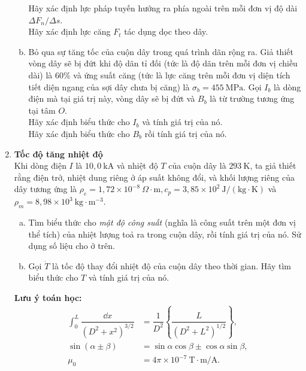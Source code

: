 \begin{vd}
\begin{enumerate}[1)]
\begin{enumerate}[a)]
Hãy xác định lực pháp tuyến hướng ra phía ngoài trên mỗi đơn vị độ dài $\Delta F_{{n}} / \Delta s$.\\
Hãy xác định lực căng $F_{t}$ tác dụng dọc theo dây.
\item Bỏ qua sự tăng tốc của cuộn dây trong quá trình dãn rộng ra. Giả thiết vòng dây sẽ bị đứt khi độ dãn tỉ đối (tức là độ dãn trên mỗi đơn vị chiều dài) là $60 \%$ và ứng suất căng (tức là lực căng trên mỗi đơn vị diện tích tiết diện ngang của sợi dây chưa bị căng) là $\sigma_{{b}}=455 ~\mathrm{MPa}$. Gọi $I_{{b}}$ là dòng điện mà tại giá trị này, vòng dây sẽ bị đứt và $B_{{b}}$ là từ trường tương ứng tại tâm $O$.\\
Hãy xác định biểu thức cho $I_{{b}}$ và tính giá trị của nó. \\
Hãy xác định biểu thức cho $B_{{b}}$ rồi tính giá trị của nó.
\end{enumerate}
\item \textbf{Tốc độ tăng nhiệt độ}\\
Khi dòng điện $I$ là $10,0 ~\mathrm{kA}$ và nhiệt độ $T$ của cuộn dây là $293 \mathrm{~K}$, ta giả thiết rằng điện trở, nhiệt dung riêng ở áp suất không đổi, và khối lượng riêng của dây tương ứng là $\rho_{e}=1,72 \times 10^{-8} ~\Omega \cdot \mathrm{m}, c_{p}=3,85 \times 10^{2} \mathrm{~J} /(\mathrm{kg} \cdot \mathrm{K})$ và $\rho_{m} = 8,98 \times 10^{3} \mathrm{~kg} \cdot \mathrm{m^{-3}}$.
\begin{enumerate}[a)]
    \item Tìm biểu thức cho \textit{mật độ công suất} (nghĩa là công suất trên một đơn vị thể tích) của nhiệt lượng toả ra trong cuộn dây, rồi tính giá trị của nó. Sử dụng số liệu cho ở trên.
    \item Gọi $\dot{T}$ là tốc độ thay đổi nhiệt độ của cuộn dây theo thời gian. Hãy tìm biểu thức cho $T$ và tính giá trị của nó.
\end{enumerate}
\textbf{Lưu ý toán học:}
\begin{align*}
\int_{0}^{L} \dfrac{\dd x}{\left(D^{2}+x^{2}\right)^{3 / 2}}&=\dfrac{1}{D^{2}}\left\{\dfrac{L}{\left(D^{2}+L^{2}\right)^{1 / 2}}\right\},\\
\sin (\alpha \pm \beta)&=\sin \alpha \cos \beta \pm \cos \alpha \sin \beta,\\
\mu_{0}&=4 \pi \times 10^{-7} \mathrm{~T} \cdot \mathrm{m} / \mathrm{A}.
\end{align*}
\end{enumerate}
\end{vd}

